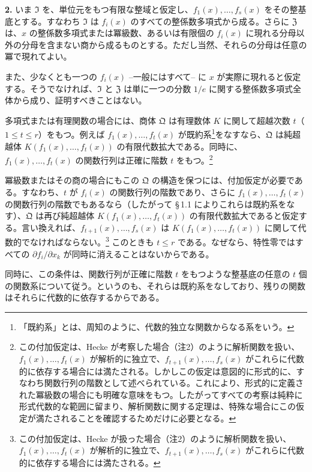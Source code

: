 \medskip\noindent\textbf{2.}
いま $\mathfrak{I}$ を、単位元をもつ有限な整域と仮定し、$f_1(x),\ldots,f_s(x)$ をその整基底とする。すなわち $\mathfrak{I}$ は $f_i(x)$ のすべての整係数多項式から成る。さらに $\mathfrak{Z}$ は、$x$ の整係数多項式または冪級数、あるいは有限個の $f_i(x)$ に現れる分母以外の分母を含まない商から成るものとする。ただし当然、それらの分母は任意の冪で現れてよい。

また、少なくとも一つの $f_i(x)$ --一般にはすべて-- に $x$ が実際に現れると仮定する。そうでなければ、$\mathfrak{I}$ と $\mathfrak{Z}$ は単に一つの分数 $1/e$ に関する整係数多項式全体から成り、証明すべきことはない。

多項式または有理関数の場合には、商体 $\mathfrak{Q}$ は有理数体 $K$ に関して超越次数 $t$（$1\le t\le r$）をもつ。例えば $f_1(x),\ldots,f_t(x)$ が既約系\footnote{「既約系」とは、周知のように、代数的独立な関数からなる系をいう。}をなすなら、$\mathfrak{Q}$ は純超越体 $K(f_1(x),\ldots,f_t(x))$ の有限代数拡大である。同時に、$f_1(x),\ldots,f_t(x)$ の関数行列は正確に階数 $t$ をもつ。\footnote{この付加仮定は、Hecke が考察した場合（注2）のように解析関数を扱い、$f_1(x),\ldots,f_t(x)$ が解析的に独立で、$f_{t+1}(x),\ldots,f_s(x)$ がこれらに代数的に依存する場合には満たされる。しかしこの仮定は意図的に形式的に、すなわち関数行列の階数として述べられている。これにより、形式的に定義された冪級数の場合にも明確な意味をもつ。したがってすべての考察は純粋に形式代数的な範囲に留まり、解析関数に関する定理は、特殊な場合にこの仮定が満たされることを確認するためだけに必要となる。}

冪級数またはその商の場合にもこの $\mathfrak{Q}$ の構造を保つには、付加仮定が必要である。すなわち、$t$ が $f_i(x)$ の関数行列の階数であり、さらに $f_1(x),\ldots,f_t(x)$ の関数行列の階数でもあるなら（したがって \S\,1.1 によりこれらは既約系をなす）、$\mathfrak{Q}$ は再び純超越体 $K(f_1(x),\ldots,f_t(x))$ の有限代数拡大であると仮定する。言い換えれば、$f_{t+1}(x),\ldots,f_s(x)$ は $K(f_1(x),\ldots,f_t(x))$ に関して代数的でなければならない。\footnote{この付加仮定は、Hecke が扱った場合（注2）のように解析関数を扱い、$f_1(x),\ldots,f_t(x)$ が解析的に独立で、$f_{t+1}(x),\ldots,f_s(x)$ がこれらに代数的に依存する場合には満たされる。} このときも $t\le r$ である。なぜなら、特性零ではすべての $\partial f_i/\partial x_k$ が同時に消えることはないからである。

同時に、この条件は、関数行列が正確に階数 $t$ をもつような整基底の任意の $t$ 個の関数系について従う。というのも、それらは既約系をなしており、残りの関数はそれらに代数的に依存するからである。

